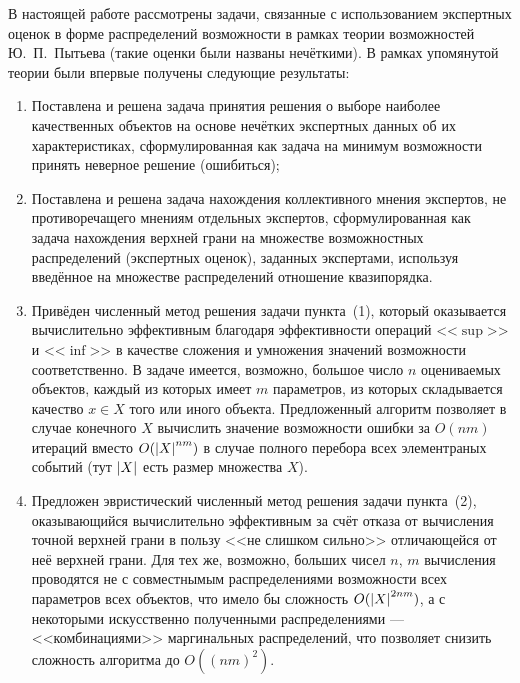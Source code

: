 
В настоящей работе рассмотрены задачи, связанные с  использованием экспертных оценок в форме распределений возможности в рамках теории возможностей Ю.~П.~Пытьева (такие оценки были названы нечёткими). В рамках упомянутой теории были впервые получены следующие результаты:
\begin{enumerate}
\item
Поставлена и решена задача принятия решения о выборе наиболее качественных объектов на основе нечётких экспертных данных об их характеристиках, сформулированная как задача на минимум возможности принять неверное решение (ошибиться);
\item
Поставлена и решена задача нахождения коллективного мнения экспертов, не противоречащего мнениям отдельных экспертов, сформулированная как задача нахождения верхней грани на множестве возможностных распределений (экспертных оценок), заданных экспертами, используя введённое на множестве распределений отношение квазипорядка.
\item 
{}
 Привёден численный метод решения задачи пункта~(1), который оказывается вычислительно эффективным благодаря эффективности операций <<$\sup$>> и <<$\inf$>> в качестве сложения и умножения значений возможности соответственно. В задаче имеется, возможно, большое число  $n$ оцениваемых объектов, каждый из которых имеет $m$ параметров, из которых складывается качество $x \in X$ того или иного объекта. Предложенный алгоритм позволяет в случае конечного $X$ вычислить значение возможности ошибки за $O(nm)$ итераций вместо $O(\left| X \right|^{nm})$ в случае полного перебора всех элементраных событий (тут $\left| X \right|$ есть размер множества $X$).
 \item
 Предложен эвристический численный метод решения задачи пункта~(2), оказывающийся вычислительно эффективным за счёт отказа от вычисления точной верхней грани в пользу <<не слишком сильно>> отличающейся от неё верхней грани. Для тех же, возможно, больших чисел $n$, $m$ вычисления проводятся не с совместнымым распределениями возможности всех параметров всех объектов, что имело бы сложность $O(\left| X \right|^{2nm})$, а с некоторыми искусственно полученными распределениями --- <<комбинациями>> маргинальных распределений, что позволяет снизить сложность алгоритма до $O((nm)^2)$.   
\end{enumerate}
